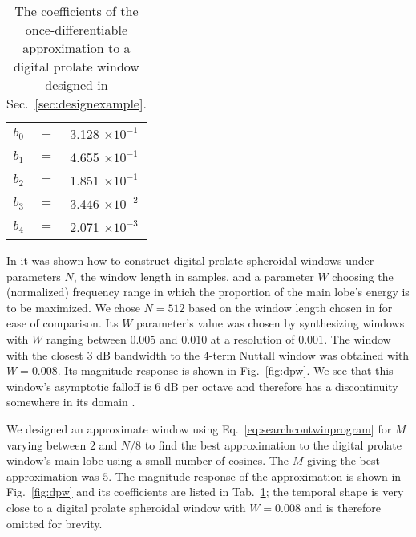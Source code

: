 \documentclass[twoside,a4paper]{article}
\begin{document}
\begin{table}[]
    \caption{The coefficients of the once-differentiable approximation to a digital prolate
    window designed in Sec.~\ref{sec:designexample}.
    \label{tab:contprolate}}
    \begin{center}
        \begin{tabular}{c c c}
            $b_0$ & $ = $ & 3.128 $\times 10^{-1}$ \\
            $b_1$ & $ = $ & 4.655 $\times 10^{-1}$ \\
            $b_2$ & $ = $ & 1.851 $\times 10^{-1}$ \\
            $b_3$ & $ = $ & 3.446 $\times 10^{-2}$ \\
            $b_4$ & $ = $ & 2.071 $\times 10^{-3}$ 
        \end{tabular}
    \end{center}
\end{table}%

In \cite{verma1996digital} it was shown how to construct digital prolate
spheroidal windows under parameters $N$, the window length in samples, and a
parameter $W$ choosing the (normalized) frequency range in which the proportion
of the main lobe's energy is to be maximized. We chose $N=512$ based on the
window length chosen in \cite{betser2009sinusoidal} for ease of comparison. Its
$W$ parameter's value was chosen by synthesizing windows with $W$ ranging
between $0.005$ and $0.010$ at a resolution of $0.001$. The window with the
closest 3 dB bandwidth to the 4-term Nuttall window was obtained with $W=0.008$.
Its magnitude response is shown in Fig.~\ref{fig:dpw}. We see that this window's
asymptotic falloff is 6 dB per octave and therefore has a discontinuity
somewhere in its domain \cite{nuttall1981some}.

We designed an approximate
window using Eq.~\ref{eq:searchcontwinprogram} for $M$ varying between $2$ and
$N/8$ to find the best approximation to the digital prolate window's main lobe
using a small number of cosines. The $M$ giving the best approximation was $5$.
The magnitude response of the approximation is shown in Fig.~\ref{fig:dpw} and
its coefficients are listed in Tab.~\ref{tab:contprolate}; the temporal shape is
very close to a digital prolate spheroidal window with $W=0.008$ and is
therefore omitted for brevity.
\end{document}

